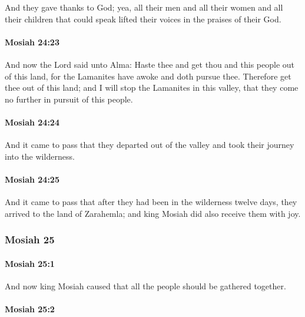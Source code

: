 			And they gave thanks to God;
			yea, all their men and all their women and all their children that could speak
			lifted their voices in the praises of their God.

		\paragraph{Mosiah 24:23} %
			\label{MOSIAH-24-23}

			And now the Lord said unto Alma:
			Haste thee and get thou and this people out of this land,
			for the Lamanites have awoke and doth pursue thee.
			Therefore get thee out of this land;
			and I will stop the Lamanites in this valley,
			that they come no further in pursuit of this people.

		\paragraph{Mosiah 24:24} %
			\label{MOSIAH-24-24}

			And it came to pass that they departed out of the valley
			and took their journey into the wilderness.

		\paragraph{Mosiah 24:25} %
			\label{MOSIAH-24-25}

			And it came to pass that after they had been in the wilderness twelve days,
			they arrived to the land of Zarahemla;
			and king Mosiah did also receive them with joy.

	\subsubsection{Mosiah 25} %
		\label{MOSIAH-25}
		
		\paragraph{Mosiah 25:1} %
			\label{MOSIAH-25-1}

			And now king Mosiah caused that all the people should be gathered together.

		\paragraph{Mosiah 25:2} %
			\label{MOSIAH-25-2}

